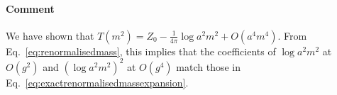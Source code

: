 \documentclass[12pt,a4paper]{report}
\newcommand{\eq}{Eq.}
\begin{document}
\paragraph{Comment}
We have shown that $T(m^2)=Z_0-\frac{1}{4\pi}\log a^2m^2 + O(a^4m^4)$.
From \eq~\eqref{eq:renormalisedmass}, this implies that the coefficients of $\log a^2m^2$ at $O(g^2)$ and $(\log a^2m^2)^2$ at $O(g^4)$ match those in \eq~\eqref{eq:exactrenormalisedmassexpansion}.
 
 
\end{document}
